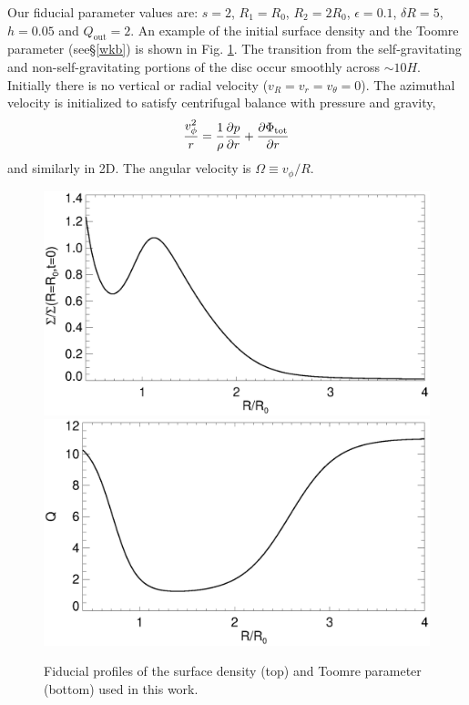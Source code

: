 Our fiducial parameter values are: $s=2$, $R_{1}=R_0$, $R_{2}=2R_0$,
$\epsilon=0.1$, $\delta R=5$, $h=0.05$ and
$Q_\mathrm{out}=2$. An example of the initial surface density and the
Toomre parameter (see\S\ref{wkb}) is shown in
Fig. \ref{initial_surf}. The transition from the self-gravitating and
non-self-gravitating portions of the disc occur smoothly across
$\sim10H$. Initially there is no vertical or radial velocity
($v_R = v_r = v_\theta = 0$). The azimuthal velocity is initialized to
satisfy centrifugal balance with pressure and gravity,
\begin{align}
  \frac{v_\phi^2}{r} = \frac{1}{\rho}\frac{\partial p}{\partial r} + \frac{\partial
    \Phi_\mathrm{tot}}{\partial r}
\end{align}
and similarly in 2D. The angular velocity is $\Omega \equiv v_\phi/R$. 


\begin{figure}
  \includegraphics[width=\linewidth,clip=true,trim=0cm 1.7cm 0cm
  0cm]{figures/compare_profiles_dens000} 
  \includegraphics[width=\linewidth]{figures/compare_profiles_Q000}
  \caption{Fiducial profiles of the surface density (top) and Toomre
    parameter (bottom) used in this work.\label{initial_surf}}
\end{figure}

